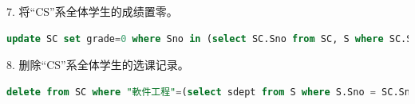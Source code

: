 \documentclass[12pt, a4paper]{report}
\begin{document}
7. 将“CS”系全体学生的成绩置零。\\

\begin{lstlisting}[language=SQL]
    update SC set grade=0 where Sno in (select SC.Sno from SC, S where SC.Sno=S.Sno and S.sdept="軟件工程");
\end{lstlisting}

\begin{figure}[H] %
    \centering %
\end{figure}

8. 删除“CS”系全体学生的选课记录。\\

\begin{lstlisting}[language=SQL]
    delete from SC where "軟件工程"=(select sdept from S where S.Sno = SC.Sno);
\end{lstlisting}

\begin{figure}[H] %
    \centering %
\end{figure}
\end{document}
